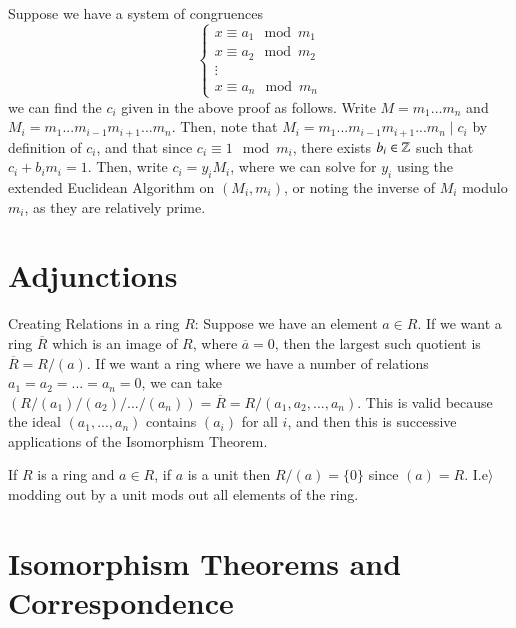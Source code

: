 \documentclass[12pt, a4paper, oneside, openright, titlepage]{book}
\begin{document}
\begin{rmk}
    Suppose we have a system of congruences \begin{equation}
        \left\{\begin{array}{l}
            x \equiv a_1 \mod m_1 \\
            x \equiv a_2 \mod m_2 \\
            \vdots \\
            x \equiv a_n \mod m_n 
            \end{array}\right.
    \end{equation}
    we can find the $c_i$ given in the above proof as follows. Write $M = m_1...m_n$ and \\$M_i = m_1...m_{i-1}m_{i+1}...m_n$. Then, note that $M_i = m_1...m_{i-1}m_{i+1}...m_n\;\vert\;c_i$ by definition of $c_i$, and that since $c_i \equiv 1 \mod m_i$, there exists $b_i \in \mathbb Z$ such that $c_i + b_im_i = 1$. Then, write $c_i = y_iM_i$, where we can solve for $y_i$ using the extended Euclidean Algorithm on $(M_i, m_i)$, or noting the inverse of $M_i$ modulo $m_i$, as they are relatively prime. 
\end{rmk}


\section{\textsection Adjunctions}

\begin{defn}
        Creating Relations in a ring $R$: Suppose we have an element $a \in R$. If we want a ring $\overline{R}$ which is an image of $R$, where $\overline{a} = 0$, then the largest such quotient is $\overline{R} = R/(a)$. If we want a ring where we have a number of relations $a_1=a_2=...=a_n=0$, we can take $(R/(a_1)/(a_2)/.../(a_n))=\overline{R}=R/(a_1,a_2,...,a_n)$. This is valid because the ideal $(a_1,...,a_n)$ contains $(a_i)$ for all $i$, and then this is successive applications of the Isomorphism Theorem.
\end{defn}

\begin{rmk}
        If $R$ is a ring and $a \in R$, if $a$ is a unit then $R/(a) = \{0\}$ since $(a) = R$. I.e$\rangle$ modding out by a unit mods out all elements of the ring.
\end{rmk}


\section{\textsection Isomorphism Theorems and Correspondence}
\end{document}
